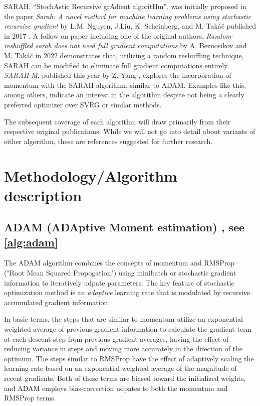 \documentclass[letterpaper,11 pt]{article}
\begin{document}
SARAH, “StochAstic Recursive grAdient algoritHm”, was initially proposed in the paper \textit{Sarah: A novel method for machine learning problems using stochastic recursive gradient} by L.M. Nguyen, J.Liu, K. Scheinberg, and M. Takáč published in 2017 \cite{nguyen}.  A follow on paper including  one of the original authors, \textit{Random-reshuffled sarah does not need full gradient computations} by A. Beznosikov and M. Takáč in 2022 \cite{Beznosikov} demonstrates that, utilizing a random reshuffling technique, SARAH can be modified to eliminate full gradient computations entirely.  \textit{SARAH-M}, published this year by Z. Yang \cite{sarahm}, explores the incorporation of momentum with the SARAH algorithm, similar to ADAM.  Examples like this, among others, indicate an interest in the algorithm despite not being a clearly preferred optimizer over SVRG or similar methods.

The subsequent coverage of each algorithm will draw primarily from their respective original publications. While we will not go into detail about variants of either algorithm, these are references suggested for further research.




\section{Methodology/Algorithm description}\label{sec:method}

\subsection{ADAM (ADAptive Moment estimation) \cite{kingma}, see \ref{alg:adam}}

The ADAM algorithm combines the concepts of momentum and RMSProp ("Root Mean Squared Propogation") using minibatch or stochastic gradient information to iteratively udpate parameters. The key feature of stochastic optimization method is an \textit{adaptive} learning rate that is modulated by recursive accumulated gradient information.  

In basic terms, the steps that are similar to momentum utilize an exponential weighted average of previous gradient information to calculate the gradient term at each descent step from previous gradient averages, having the effect of reducing variance in steps and moving more accurately in the direction of the optimum.  The steps similar to RMSProp have the effect of adaptively scaling the learning rate based on an exponential weighted average of the magnitude of recent gradients.  Both of these terms are biased toward the initialized weights, and ADAM employs bias-correction udpates to both the momentum and RMSProp terms.  
\end{document}
